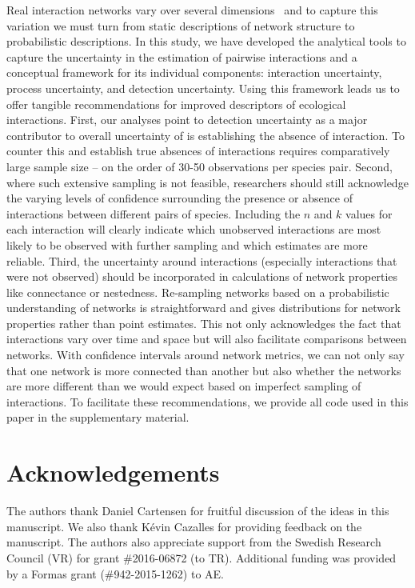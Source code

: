 \documentclass[12pt]{article}
\begin{document}
\begin{spacing}{2.0}
  Real interaction networks vary over several dimensions~\citep{Kitching1987,Olesen2011a,Pires2011a,Baiser2012,Fodrie2015,Novak2015} and to capture this variation we must turn from static descriptions of network structure to probabilistic descriptions. In this study, we have developed the analytical tools to capture the uncertainty in the estimation of pairwise interactions and a conceptual framework for its individual components: interaction uncertainty, process uncertainty, and detection uncertainty. Using this framework leads us to offer tangible recommendations for improved descriptors of ecological interactions. First, our analyses point to detection uncertainty as a major contributor to overall uncertainty of is establishing the absence of interaction. To counter this and establish true absences of interactions requires comparatively large sample size – on the order of 30-50 observations per species pair. Second, where such extensive sampling is not feasible, researchers should still acknowledge the varying levels of confidence surrounding the presence or absence of interactions between different pairs of species. Including the $n$ and $k$ values for each interaction will clearly indicate which unobserved interactions are most likely to be observed with further sampling and which estimates are more reliable. Third, the uncertainty around interactions (especially interactions that were not observed) should be incorporated in calculations of network properties like connectance or nestedness. Re-sampling networks based on a probabilistic understanding of networks is straightforward and gives distributions for network properties rather than point estimates. This not only acknowledges the fact that interactions vary over time and space but will also facilitate comparisons between networks. With confidence intervals around network metrics, we can not only say that one network is more connected than another but also whether the networks are more different than we would expect based on imperfect sampling of interactions. To facilitate these recommendations, we provide all code used in this paper in the supplementary material. 


\section*{Acknowledgements}

  The authors thank Daniel Cartensen for fruitful discussion of the ideas in this manuscript. We also thank K\'{e}vin Cazalles for providing feedback on the manuscript. The authors also appreciate support from the Swedish Research Council (VR) for grant \#2016-06872 (to TR). Additional funding was provided by a Formas grant (\#942-2015-1262) to AE.



\end{spacing}
\end{document}
